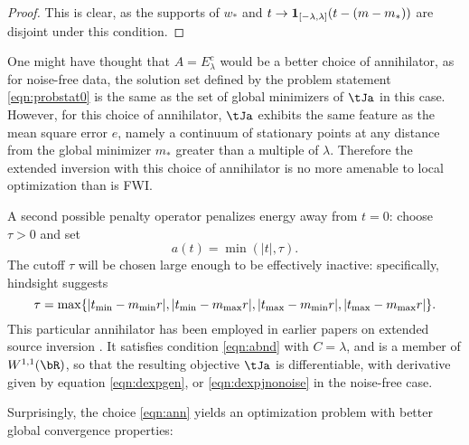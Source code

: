 \begin{proof}
  This is clear, as the supports of $w_*$ and $t \rightarrow {\bf
    1}_{[-\lambda,\lambda]}(t-(m-m_*))$ are disjoint under this
  condition.
\end{proof}

One might have thought that $A=E^c_{\lambda}$ would be a better choice
of annihilator, as for noise-free
data, the solution set defined by the problem statement
\ref{eqn:probstat0} is the same as the set of global minimizers of
$\tJa$ in this case. However, for this choice of annihilator,
$\tJa$ exhibits the same feature as the mean square error $e$, namely
a continuum of stationary points at any distance from the global
minimizer $m_*$ greater than a multiple of $\lambda$. Therefore the
extended inversion with this choice of annihilator is no more amenable
to local optimization than is FWI. 

A second possible 
penalty operator penalizes energy away from 
$t=0$: choose $\tau > 0$ and set 
\begin{equation}
  \label{eqn:ann}
  a(t) = \min(|t|, \tau). 
\end{equation}
The cutoff $\tau$ will be chosen large enough to be effectively inactive: 
specifically, hindsight suggests 
\begin{equation}
  \label{eqn:taudef}
  \tau = \max\{|t_{\rm min}-m_{\rm min}r|,|t_{\rm min}-m_{\rm max}r|, |t_{\rm max}-m_{\rm min}r|, |t_{\rm max}-m_{\rm max}r|\}. 
\end{equation}
This 
particular annihilator has been employed in earlier papers on extended 
source inversion 
\cite[]{Plessix:00a,LuoSava:11,Warner:14,HuangSymes:SEG15a,Warner:16,HuangSymes:GEO17}. It
satisfies condition \ref{eqn:abnd} with $C=\lambda$, and is a member
of $W^{1,1}(\bR)$, so that the resulting objective $\tJa$ is
differentiable, with derivative given by equation \ref{eqn:dexpgen},
or \ref{eqn:dexpjnonoise} in the noise-free case. 

Surprisingly, the choice \ref{eqn:ann} yields an optimization
problem with better global convergence properties:

